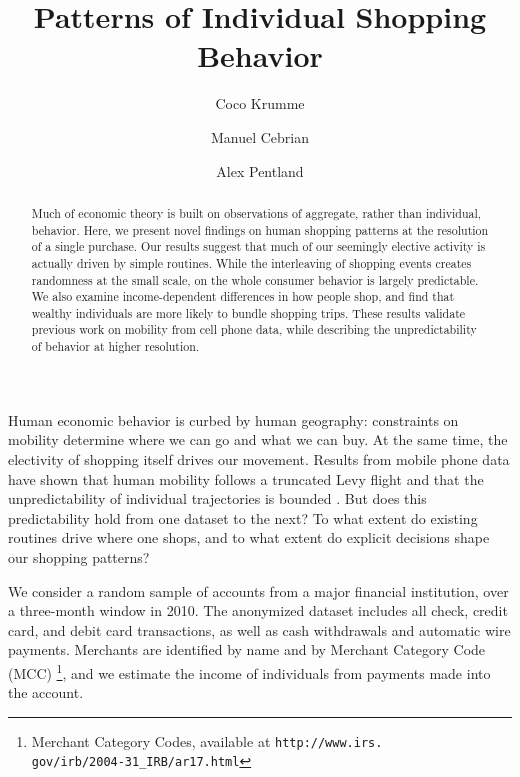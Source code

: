 \documentclass[twocolumn,floatfix]{revtex4}
\begin{document}
\title{Patterns of Individual Shopping Behavior}

\author{Coco Krumme}
\author{Manuel Cebrian}
\author{Alex Pentland}

\begin{abstract}
Much of economic theory is built on observations of aggregate, rather than individual, behavior. Here, we present novel findings on human shopping patterns at the resolution of a single purchase. Our results suggest that much of our seemingly elective activity is actually driven by simple routines. While the interleaving of shopping events creates randomness at the small scale, on the whole consumer behavior is largely predictable. We also examine income-dependent differences in how people shop, and find that wealthy individuals are more likely to bundle shopping trips. These results validate previous work on mobility from cell phone data, while describing the unpredictability of behavior at higher resolution. 

\end{abstract}

\maketitle

Human economic behavior is curbed by human geography: constraints on mobility determine where we can go and what we can buy. At the same time, the electivity of shopping itself drives our movement. Results from mobile phone data have shown that human mobility follows a truncated Levy flight \cite{gonzalez2008understanding}  and that the unpredictability of individual trajectories is bounded \cite{song2010limits}. But does this predictability hold from one dataset to the next? To what extent do existing routines drive where one shops, and to what extent do explicit decisions shape our shopping patterns? 

We consider a random sample of  accounts from a major financial institution, over a three-month window in 2010. The anonymized dataset includes all check, credit card, and debit card transactions, as well as cash withdrawals and automatic wire payments. Merchants are identified by name and by Merchant Category Code (MCC) \footnote{Merchant Category Codes, available at {\tt http://www.irs.\\gov/irb/2004-31\_IRB/ar17.html}}, and we estimate the income of individuals from payments made into the account.  
\end{document}
